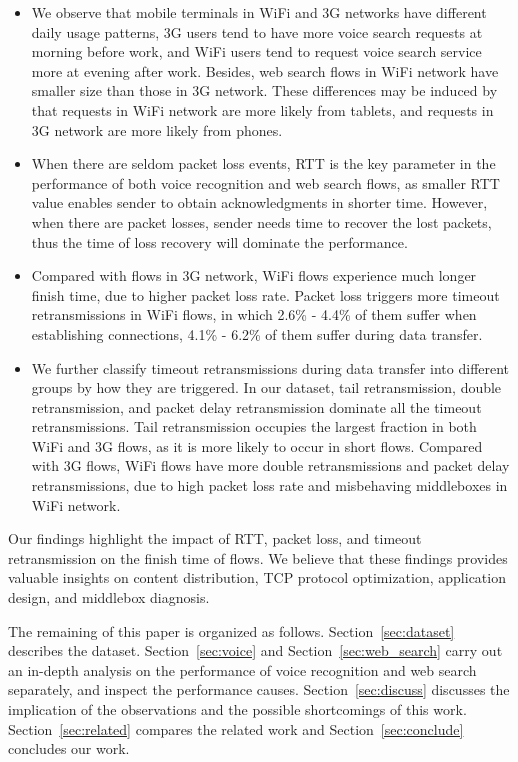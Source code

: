 \begin{itemize}
\item We observe that mobile terminals in WiFi and 3G networks have different daily usage patterns, 3G users tend to have more voice search requests at morning before work, and WiFi users tend to request voice search service more at evening after work. Besides, web search flows in WiFi network have smaller size than those in 3G network. These differences may be induced by that requests in WiFi network are more likely from tablets, and requests in 3G network are more likely from phones. 
\item When there are seldom packet loss events, RTT is the key parameter in the performance of both voice recognition and web search flows, as smaller RTT value enables sender to obtain acknowledgments in shorter time. However, when there are packet losses, sender needs time to recover the lost packets, thus the time of loss recovery will dominate the performance.
\item Compared with flows in 3G network, WiFi flows experience much longer finish time, due to higher packet loss rate. Packet loss triggers more timeout retransmissions in WiFi flows, in which 2.6\% - 4.4\% of them suffer when establishing connections, 4.1\% - 6.2\% of them suffer during data transfer.
\item We further classify timeout retransmissions during data transfer into different groups by how they are triggered. In our dataset, tail retransmission, double retransmission, and packet delay retransmission dominate all the timeout retransmissions. Tail retransmission occupies the largest fraction in both WiFi and 3G flows, as it is more likely to occur in short flows. Compared with 3G flows, WiFi flows have more double retransmissions and packet delay retransmissions, due to high packet loss rate and misbehaving middleboxes in WiFi network.
\end{itemize}

Our findings highlight the impact of RTT, packet loss, and timeout retransmission on the finish time of flows. We believe that these findings provides valuable insights on content distribution, TCP protocol optimization, application design, and middlebox diagnosis.

The remaining of this paper is organized as follows. Section~\ref{sec:dataset} describes the dataset. Section~\ref{sec:voice} and Section~\ref{sec:web_search} carry out an in-depth analysis on the performance of voice recognition and web search separately, and inspect the performance causes. Section~\ref{sec:discuss} discusses the implication of the observations and the possible shortcomings of this work. Section~\ref{sec:related} compares the related work and Section~\ref{sec:conclude} concludes our work. 